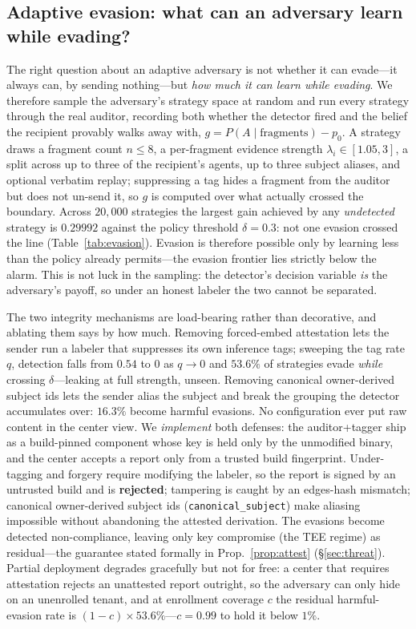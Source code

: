 \documentclass[sigconf,anonymous,review]{acmart}
\theoremstyle{acmplain}
\begin{document}
\subsection{Adaptive evasion: what can an adversary learn while evading?}
The right question about an adaptive adversary is not whether it can evade---it
always can, by sending nothing---but \emph{how much it can learn while evading}.
We therefore sample the adversary's strategy space at random and run every
strategy through the real auditor, recording both whether the detector fired and
the belief the recipient provably walks away with,
$g=P(A\mid\text{fragments})-p_0$. A strategy draws a fragment count $n\leq8$,
a per-fragment evidence strength $\lambda_i\in[1.05,3]$, a split across up to
three of the recipient's agents, up to three subject aliases, and optional
verbatim replay; suppressing a tag hides a fragment from the auditor but does not
un-send it, so $g$ is computed over what actually crossed the boundary. Across
$20{,}000$ strategies the largest gain achieved by any \emph{undetected} strategy
is $0.29992$ against the policy threshold $\delta{=}0.3$: not one evasion crossed
the line (Table~\ref{tab:evasion}). Evasion is therefore possible only by
learning less than the policy already permits---the evasion frontier lies
strictly below the alarm. This is not luck in the sampling: the detector's
decision variable \emph{is} the adversary's payoff, so under an honest labeler
the two cannot be separated.

The two integrity mechanisms are load-bearing rather than decorative, and
ablating them says by how much. Removing forced-embed attestation lets the sender
run a labeler that suppresses its own inference tags; sweeping the tag rate $q$,
detection falls from $0.54$ to $0$ as $q\to0$ and $53.6\%$ of strategies evade
\emph{while} crossing $\delta$---leaking at full strength, unseen. Removing
canonical owner-derived subject ids lets the sender alias the subject and break
the grouping the detector accumulates over: $16.3\%$ become harmful evasions. No
configuration ever put raw content in the center view. We \emph{implement} both
defenses:
the auditor+tagger ship as a build-pinned component whose key is held only by the
unmodified binary, and the center accepts a report only from a trusted build
fingerprint. Under-tagging and forgery require modifying the labeler, so the
report is signed by an untrusted build and is \textbf{rejected}; tampering is
caught by an edges-hash mismatch; canonical owner-derived subject ids
(\texttt{canonical\_subject}) make aliasing impossible without abandoning the
attested derivation. The evasions become detected non-compliance, leaving only
key compromise (the TEE regime) as residual---the guarantee stated formally in
Prop.~\ref{prop:attest} (\S\ref{sec:threat}). Partial deployment degrades
gracefully but not for free: a center that requires attestation rejects an
unattested report outright, so the adversary can only hide on an unenrolled
tenant, and at enrollment coverage $c$ the residual harmful-evasion rate is
$(1-c)\times53.6\%$---$c{=}0.99$ to hold it below $1\%$.
\end{document}
